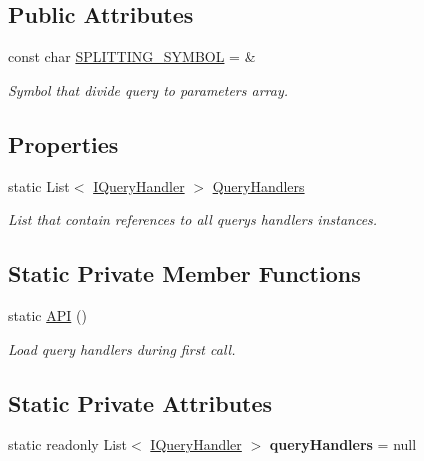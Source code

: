 \subsection*{Public Attributes}
\begin{DoxyCompactItemize}
\item 
const char \mbox{\hyperlink{class_uniform_queries_1_1_a_p_i_aa906970223172f9f2068baa410b621d8}{S\+P\+L\+I\+T\+T\+I\+N\+G\+\_\+\+S\+Y\+M\+B\+OL}} = \textquotesingle{}\&\textquotesingle{}
\begin{DoxyCompactList}\small\item\em Symbol that divide query to parameters array. \end{DoxyCompactList}\end{DoxyCompactItemize}
\subsection*{Properties}
\begin{DoxyCompactItemize}
\item 
static List$<$ \mbox{\hyperlink{interface_uniform_queries_1_1_i_query_handler}{I\+Query\+Handler}} $>$ \mbox{\hyperlink{class_uniform_queries_1_1_a_p_i_a759098e511956b9afaaaf3ab13af336e}{Query\+Handlers}}
\begin{DoxyCompactList}\small\item\em List that contain references to all query\textquotesingle{}s handlers instances. \end{DoxyCompactList}\end{DoxyCompactItemize}
\subsection*{Static Private Member Functions}
\begin{DoxyCompactItemize}
\item 
static \mbox{\hyperlink{class_uniform_queries_1_1_a_p_i_a8dbe3d00dcf507ab3cea1dc58e1e154f}{A\+PI}} ()
\begin{DoxyCompactList}\small\item\em Load query handlers during first call. \end{DoxyCompactList}\end{DoxyCompactItemize}
\subsection*{Static Private Attributes}
\begin{DoxyCompactItemize}
\item 
\mbox{\label{class_uniform_queries_1_1_a_p_i_a8ec82d8dfe03f81379e43520e0b0abde}} 
static readonly List$<$ \mbox{\hyperlink{interface_uniform_queries_1_1_i_query_handler}{I\+Query\+Handler}} $>$ {\bfseries query\+Handlers} = null
\end{DoxyCompactItemize}


